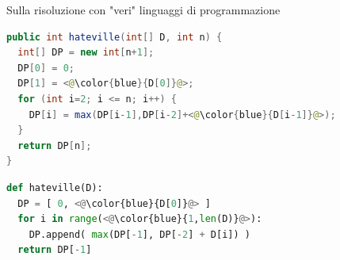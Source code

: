 \begin{frame}{Sulla risoluzione con "veri" linguaggi di programmazione}

\small
\vspace{-9pt}
\begin{myboxtitle}[Java]
\vspace{-8pt}
\begin{lstlisting}[language=java]
public int hateville(int[] D, int n) {
  int[] DP = new int[n+1];
  DP[0] = 0;
  DP[1] = <@\color{blue}{D[0]}@>;
  for (int i=2; i <= n; i++) {
    DP[i] = max(DP[i-1],DP[i-2]+<@\color{blue}{D[i-1]}@>);
  }
  return DP[n];
}
\end{lstlisting}
\vspace{-8pt}
\end{myboxtitle}

\begin{myboxtitle}[Python]
\vspace{-8pt}
\begin{lstlisting}[language=python]
def hateville(D):
  DP = [ 0, <@\color{blue}{D[0]}@> ]
  for i in range(<@\color{blue}{1,len(D)}@>):
    DP.append( max(DP[-1], DP[-2] + D[i]) )
  return DP[-1]
\end{lstlisting}
\vspace{-8pt}
\end{myboxtitle}


\end{frame}




